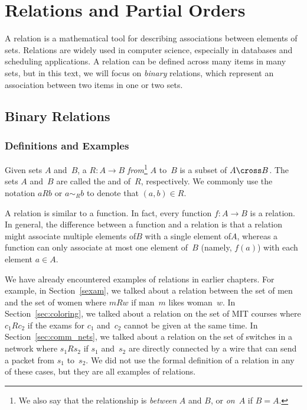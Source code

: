 \chapter{Relations and Partial Orders}\label{chap:partial_orders}

A relation is a mathematical tool for describing associations between
elements of sets.  Relations are widely used in computer science,
especially in databases and scheduling applications.  A relation can
be defined across many items in many sets, but in this text, we will
focus on \emph{binary} relations, which represent an association
between two items in one or two sets.

\section{Binary Relations}

\subsection{Definitions and Examples}

\begin{definition}\label{def:binary_relation}
Given sets $A$ and~$B$, a  $R: A \to B$
\emph{from}\footnote{We also say that the relationship is
  \emph{between} $A$ and $B$, or \emph{on}~$A$ if $B = A$.} $A$ to~$B$
is a subset of $A \cross B$.  The sets $A$ and~$B$ are called the
 and  of~$R$, respectively.  We commonly
use the notation $aRb$ or $a \sim_R b$ to denote that $(a, b) \in R$.
\end{definition}

A relation is similar to a function.  In fact, every function $f: A
\to B$ is a relation.  In general, the difference between a function
and a relation is that a relation might associate multiple elements
of$B$ with a single element of$A$, whereas a function can only
associate at most one element of~$B$ (namely, $f(a)$) with each
element $a \in A$.

We have already encountered examples of relations in earlier chapters.
For example, in Section~\ref{sexam}, we talked about a relation
between the set of men and the set of women where $mRw$ if man~$m$
likes woman~$w$.  In Section~\ref{sec:coloring}, we talked about a
relation on the set of MIT courses where $c_1 R c_2$ if the exams for
$c_1$ and~$c_2$ cannot be given at the same time.  In
Section~\ref{sec:comm_nets}, we talked about a relation on the set of
switches in a network where $s_1 R s_2$ if $s_1$ and~$s_2$ are
directly connected by a wire that can send a packet from $s_1$
to~$s_2$.  We did not use the formal definition of a relation in any
of these cases, but they are all examples of relations.

